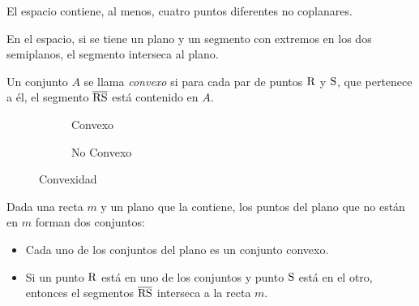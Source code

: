 \begin{postulate}
El espacio contiene, al menos, cuatro puntos diferentes no coplanares.
\end{postulate}

\begin{postulate}
    En el espacio, si se tiene un plano y un segmento con extremos en los dos semiplanos, el segmento interseca al plano.
\end{postulate}

\begin{definition}
    Un conjunto $A$ se llama \textit{convexo} si para cada par de puntos $\rm R$ y $\rm S$, que pertenece a él, el segmento $\overline{\rm RS}$ está contenido en $A$.

    \begin{figure}[h!]

        \centering

        \begin{subfigure}[b]{.5\textwidth}
            \centering
            
            \label{fig:plot24}
            \caption{Convexo}            
        \end{subfigure}%
        \begin{subfigure}[b]{.5\textwidth}
            \centering
            
            \label{fig:plot25}
            \caption{No Convexo}            
        \end{subfigure}
        
        \centering
        \caption{Convexidad}
        \label{fig:convexidad}
    
    \end{figure}
    
\end{definition}

\begin{postulate}
    Dada una recta $m$ y un plano que la contiene, los puntos del plano que no están en $m$ forman dos conjuntos:

    \begin{itemize}
        \item Cada uno de los conjuntos del plano es un conjunto convexo.
        \item Si un punto $\rm R$ está en uno de los conjuntos y punto $\rm S$ está en el otro, entonces el segmentos $\overline{\rm RS}$ interseca a la recta $m$.
    \end{itemize}
\end{postulate}

